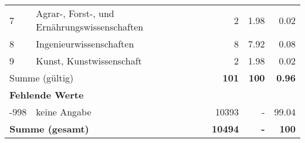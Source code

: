 \begin{longtable}{lXrrr}
     7 &
     \multicolumn{1}{X}{ Agrar-, Forst-, und Ernährungswissenschaften   } &


       \num{2} &
       \num[round-mode=places,round-precision=2]{1,98} &
         \num[round-mode=places,round-precision=2]{0,02} \\

     8 &
     \multicolumn{1}{X}{ Ingenieurwissenschaften   } &


       \num{8} &
       \num[round-mode=places,round-precision=2]{7,92} &
         \num[round-mode=places,round-precision=2]{0,08} \\

     9 &
     \multicolumn{1}{X}{ Kunst, Kunstwissenschaft   } &


       \num{2} &
       \num[round-mode=places,round-precision=2]{1,98} &
         \num[round-mode=places,round-precision=2]{0,02} \\
     \midrule
     \multicolumn{2}{l}{Summe (gültig)} &
       \textbf{\num{101}} &
     \textbf{100} &
       \textbf{\num[round-mode=places,round-precision=2]{0,96}} \\
     \multicolumn{5}{l}{\textbf{Fehlende Werte}}\\
       -998 &
       keine Angabe &
         \num{10393} &
        - &
         \num[round-mode=places,round-precision=2]{99,04} \\
     \midrule
     \multicolumn{2}{l}{\textbf{Summe (gesamt)}} &
          \textbf{\num{10494}} &
        \textbf{-} &
        \textbf{100} \\
     \bottomrule
     \end{longtable}
     
